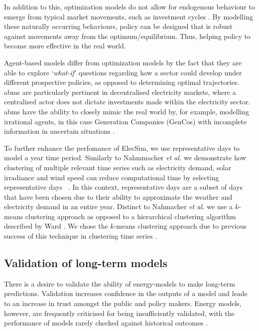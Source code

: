 In addition to this, optimization models do not allow for  endogenous behaviour to emerge from typical market movements, such as investment cycles \cite{Chappin2017, Gross2007}. By modelling these naturally occurring behaviours, policy can be designed that is robust against movements away from the optimum/equilibrium. Thus, helping policy to become more effective in the real world. 

Agent-based models differ from optimization models by the fact that they are able to explore `\textit{what-if}' questions regarding how a sector could develop under different prospective policies, as opposed to determining optimal trajectories. \acrshort{abm}s are particularly pertinent in decentralised electricity markets, where a centralised actor does not dictate investments made within the electricity sector. \acrshort{abm}s have the ability to closely mimic the real world by, for example, modelling irrational agents, in this case Generation Companies (GenCos) with incomplete information in uncertain situations \cite{Ghorbani2014}. 


To further enhance the perfomance of ElecSim, we use representative days to model a year time period. Similarly to Nahmmacher \textit{et al.} we demonstrate how clustering of multiple relevant time series such as electricity demand, solar irradiance and wind speed can reduce computational time by selecting representative days ~\cite{Nahmmacher2016}. In this context, representative days are a subset of days that have been chosen due to their ability to approximate the weather and electricity demand in an entire year. Distinct to Nahmacher \textit{et al.} we use a $k$-means clustering approach \cite{forgy65} as opposed to a hierarchical clustering algorithm described by Ward \cite{doi:10.1080/01621459.1963.10500845}. We chose the $k$-means clustering approach due to previous success of this technique in clustering time series \cite{Kell2018a}. 



\subsection{Validation of long-term models}

There is a desire to validate the ability of energy-models to make long-term predictions. Validation increases confidence in the outputs of a model and leads to an increase in trust amongst the public and policy makers. Energy models, however, are frequently criticised for being insufficiently validated, with the performance of models rarely checked against historical outcomes \cite{Beckman2011}.

